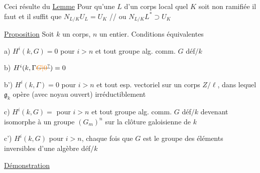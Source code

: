 
Ceci résulte du \uline{Lemme} Pour qu'une  $L$ d'un corps local  quel $K$ soit non ramifiée il faut et il suffit que $N_{L/K}U_L=U_K$ // ou $N_{L/K}L^*\supset U_K$



\uline{Proposition} Soit $k$ un corps, $n$ un entier. Conditions équivalentes

a) $H^i(k,G)=0$ pour $i>n$ et tout groupe alg. comm. $G$ déf$/k$

b) $H^i(k,\Gamma\deleted{\unsure{G|0}})=0$ 

b') $H^i(k,\Gamma)=0$ pour $i>n$ et tout   esp. vectoriel sur un corps $Z/\ell$, dans lequel $\mathfrak g_k$ opère (avec noyau ouvert) irréductiblement


c) $H^i(k,G)=$ pour $i>n$ et tout groupe alg. comm. $G$ déf$/k$  devenant isomorphe à un groupe  $(G_m)^n$ sur la clôture galoisienne de $k$

c') $H^i(k,G)$  pour $i>n$, chaque fois que $G$ est le groupe des éléments inversibles d'une algèbre    déf$/k$

\uline{Démonstration}


